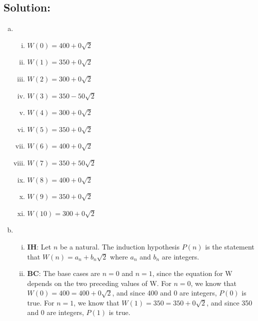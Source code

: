 \documentclass[12pt]{article}
\begin{document}
	\subsection*{\textbf{Solution:}}

	\begin{enumerate}[(a)]
		\item \
			\begin{enumerate}[(i)]
				\item $W(0)=400+0\sqrt{2}$

				\item $W(1)=350+0\sqrt{2}$

				\item $W(2)=300+0\sqrt{2}$

				\item $W(3)=350-50\sqrt{2}$

				\item $W(4)=300+0\sqrt{2}$

				\item $W(5)=350+0\sqrt{2}$

				\item $W(6)=400+0\sqrt{2}$

				\item $W(7)=350+50\sqrt{2}$

				\item $W(8)=400+0\sqrt{2}$

				\item $W(9)=350+0\sqrt{2}$

				\item $W(10)=300+0\sqrt{2}$
			\end{enumerate}

		\item \
			\begin{enumerate}[(i)]
				\item \textbf{IH}: Let $n$ be a natural. The induction hypothesis $P(n)$
					is the statement that $W(n)=a_{n}+b_{n}\sqrt{2}$ where $a_{n}$ and
					$b_{n}$ are integers.

				\item \textbf{BC}: The base cases are $n=0$ and $n=1$, since the
					equation for W depends on the two preceding values of W. For $n=0$, we
					know that $W(0)=400=400+0\sqrt{2}$, and since 400 and 0 are integers,
					$P(0)$ is true. For $n=1$, we know that $W(1)=350=350+0\sqrt{2}$, and since
					350 and 0 are integers, $P(1)$ is true.


\end{enumerate}
\end{enumerate}
\end{document}

